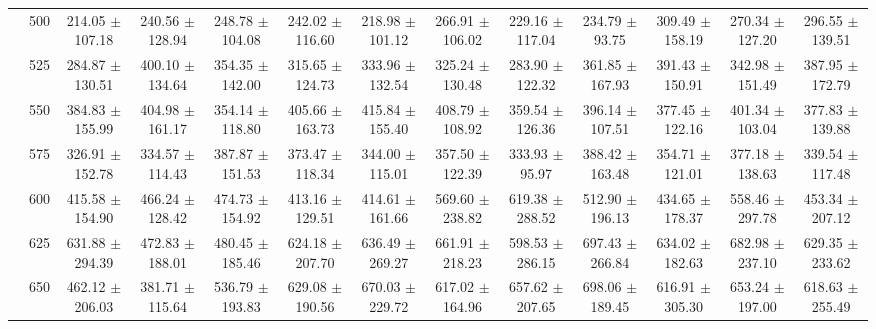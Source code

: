 \begin{table}[h]
{\begin{tabular}{
        ccccccccccccc}
 & 500& 214.05 $\pm$ 107.18& 240.56 $\pm$ 128.94& 248.78 $\pm$ 104.08& 242.02 $\pm$ 116.60& 218.98 $\pm$ 101.12& 266.91 $\pm$ 106.02& 229.16 $\pm$ 117.04& 234.79 $\pm$ 93.75& 309.49 $\pm$ 158.19& 270.34 $\pm$ 127.20& 296.55 $\pm$ 139.51 \\ 
 & 525& 284.87 $\pm$ 130.51& 400.10 $\pm$ 134.64& 354.35 $\pm$ 142.00& 315.65 $\pm$ 124.73& 333.96 $\pm$ 132.54& 325.24 $\pm$ 130.48& 283.90 $\pm$ 122.32& 361.85 $\pm$ 167.93& 391.43 $\pm$ 150.91& 342.98 $\pm$ 151.49& 387.95 $\pm$ 172.79 \\ 
 & 550& 384.83 $\pm$ 155.99& 404.98 $\pm$ 161.17& 354.14 $\pm$ 118.80& 405.66 $\pm$ 163.73& 415.84 $\pm$ 155.40& 408.79 $\pm$ 108.92& 359.54 $\pm$ 126.36& 396.14 $\pm$ 107.51& 377.45 $\pm$ 122.16& 401.34 $\pm$ 103.04& 377.83 $\pm$ 139.88 \\ 
 & 575& 326.91 $\pm$ 152.78& 334.57 $\pm$ 114.43& 387.87 $\pm$ 151.53& 373.47 $\pm$ 118.34& 344.00 $\pm$ 115.01& 357.50 $\pm$ 122.39& 333.93 $\pm$ 95.97& 388.42 $\pm$ 163.48& 354.71 $\pm$ 121.01& 377.18 $\pm$ 138.63& 339.54 $\pm$ 117.48 \\ 
 & 600& 415.58 $\pm$ 154.90& 466.24 $\pm$ 128.42& 474.73 $\pm$ 154.92& 413.16 $\pm$ 129.51& 414.61 $\pm$ 161.66& 569.60 $\pm$ 238.82& 619.38 $\pm$ 288.52& 512.90 $\pm$ 196.13& 434.65 $\pm$ 178.37& 558.46 $\pm$ 297.78& 453.34 $\pm$ 207.12 \\ 
 & 625& 631.88 $\pm$ 294.39& 472.83 $\pm$ 188.01& 480.45 $\pm$ 185.46& 624.18 $\pm$ 207.70& 636.49 $\pm$ 269.27& 661.91 $\pm$ 218.23& 598.53 $\pm$ 286.15& 697.43 $\pm$ 266.84& 634.02 $\pm$ 182.63& 682.98 $\pm$ 237.10& 629.35 $\pm$ 233.62 \\ 
 & 650& 462.12 $\pm$ 206.03& 381.71 $\pm$ 115.64& 536.79 $\pm$ 193.83& 629.08 $\pm$ 190.56& 670.03 $\pm$ 229.72& 617.02 $\pm$ 164.96& 657.62 $\pm$ 207.65& 698.06 $\pm$ 189.45& 616.91 $\pm$ 305.30& 653.24 $\pm$ 197.00& 618.63 $\pm$ 255.49 \\ \hline 

        \end{tabular}%
        }

        \end{table}
        
